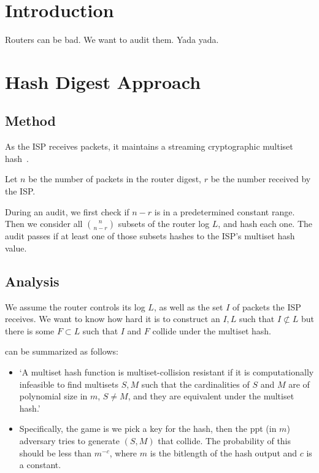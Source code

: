 \documentclass{article}
\begin{document}
\section{Introduction}
Routers can be bad. We want to audit them. Yada yada.

\section{Hash Digest Approach}
\subsection{Method}
As the ISP receives packets, it maintains a streaming cryptographic multiset
hash~\cite{clarke2003incremental}.

Let $n$ be the number of packets in the router digest, $r$ be the number
received by the ISP.

During an audit, we first check if $n - r$ is in a predetermined constant
range. Then we consider all $\binom{n}{n - r}$ subsets of the router log $L$,
and hash each one. The audit passes if at least one of those subsets hashes to
the ISP's multiset hash value.

\subsection{Analysis}
We assume the router controls its log $L$, as well as the set $I$ of packets
the ISP receives. We want to know how hard it is to construct an $I, L$ such
that $I \not\subset L$ but there is some $F \subset L$ such that $I$ and $F$
collide under the multiset hash.

\cite{clarke2003incremental} can be summarized as follows:
\begin{itemize}
    \item `A multiset hash function is multiset-collision resistant if it is
        computationally infeasible to find multisets $S, M$ such that the
        cardinalities of $S$ and $M$ are of polynomial size in $m$, $S \neq M$,
        and they are equivalent under the multiset hash.'
    \item Specifically, the game is we pick a key for the hash, then the ppt
        (in $m$) adversary tries to generate $(S, M)$ that collide. The
        probability of this should be less than $m^{-c}$, where $m$ is the
        bitlength of the hash output and $c$ is a constant.
\end{itemize}
\end{document}
